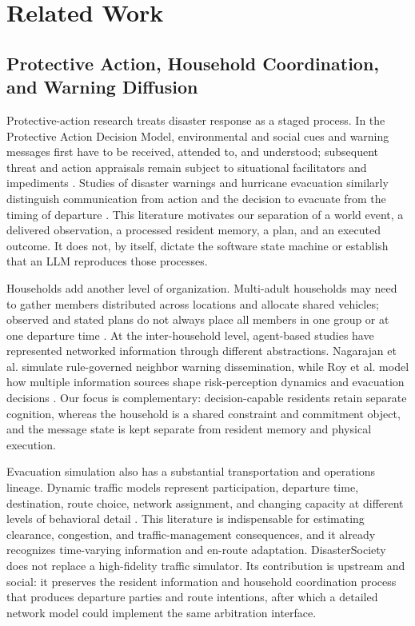 \documentclass[journal]{IEEEtran}
\begin{document}
\section{Related Work}

\subsection{Protective Action, Household Coordination, and Warning Diffusion}

Protective-action research treats disaster response as a staged process. In the
Protective Action Decision Model, environmental and social cues and warning
messages first have to be received, attended to, and understood; subsequent
threat and action appraisals remain subject to situational facilitators and
impediments \cite{lindell2012padm}. Studies of disaster warnings and hurricane
evacuation similarly distinguish communication from action and the decision to
evacuate from the timing of departure
\cite{mileti1992warnings,huang2012ike,kuligowski2021wildfire}. This literature
motivates our separation of a world event, a delivered observation, a processed
resident memory, a plan, and an executed outcome. It does not, by itself, dictate
the software state machine or establish that an LLM reproduces those processes.

Households add another level of organization. Multi-adult households may need to
gather members distributed across locations and allocate shared vehicles;
observed and stated plans do not always place all members in one group or at one
departure time
\cite{liu2014uniting,maghelal2017split}. At the inter-household level, agent-based
studies have represented networked information through different abstractions.
Nagarajan et al. simulate rule-governed neighbor warning dissemination, while
Roy et al. model how multiple information sources shape risk-perception dynamics
and evacuation decisions \cite{dawson2012warning,raihan2022information}. Our
focus is complementary: decision-capable residents retain separate cognition,
whereas the household is a shared constraint and commitment object, and the
message state is kept separate from resident memory and physical execution.

Evacuation simulation also has a substantial transportation and operations
lineage. Dynamic traffic models represent participation, departure time,
destination, route choice, network assignment, and changing capacity at
different levels of behavioral detail \cite{pel2012travel,murraytuite2013overview}.
This literature is indispensable for estimating clearance, congestion, and
traffic-management consequences, and it already recognizes time-varying
information and en-route adaptation. DisasterSociety does not replace a
high-fidelity traffic simulator. Its contribution is upstream and social: it
preserves the resident information and household coordination process that
produces departure parties and route intentions, after which a detailed network
model could implement the same arbitration interface.
\end{document}
